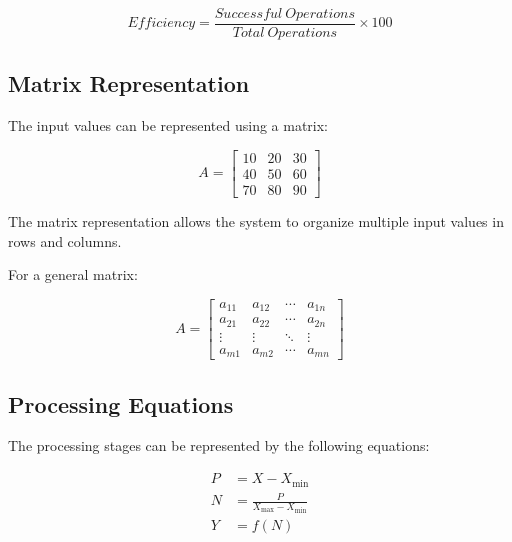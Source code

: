 \documentclass[conference]{IEEEtran}
\begin{document}
\begin{equation}
Efficiency =
\frac{Successful\ Operations}
{Total\ Operations}
\times 100
\label{eq:efficiency}
\end{equation}


\subsection{Matrix Representation}

The input values can be represented using a matrix:

\begin{equation}
A =
\begin{bmatrix}
10 & 20 & 30\\
40 & 50 & 60\\
70 & 80 & 90
\end{bmatrix}
\label{eq:matrix}
\end{equation}

The matrix representation allows the system to organize
multiple input values in rows and columns.

For a general matrix:

\begin{equation}
A =
\begin{bmatrix}
a_{11} & a_{12} & \cdots & a_{1n}\\
a_{21} & a_{22} & \cdots & a_{2n}\\
\vdots & \vdots & \ddots & \vdots\\
a_{m1} & a_{m2} & \cdots & a_{mn}
\end{bmatrix}
\end{equation}


\subsection{Processing Equations}

The processing stages can be represented by the following
equations:

\begin{align}
P &= X - X_{\min}
\label{eq:p}\\
N &= \frac{P}{X_{\max}-X_{\min}}
\label{eq:n}\\
Y &= f(N)
\label{eq:y}
\end{align}
\end{document}
